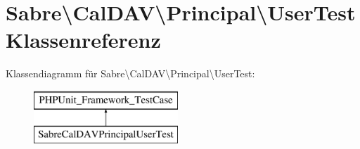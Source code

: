 \hypertarget{class_sabre_1_1_cal_d_a_v_1_1_principal_1_1_user_test}{}\section{Sabre\textbackslash{}Cal\+D\+AV\textbackslash{}Principal\textbackslash{}User\+Test Klassenreferenz}
\label{class_sabre_1_1_cal_d_a_v_1_1_principal_1_1_user_test}
Klassendiagramm für Sabre\textbackslash{}Cal\+D\+AV\textbackslash{}Principal\textbackslash{}User\+Test\+:\begin{figure}[H]
\begin{center}
\leavevmode
\includegraphics[height=2.000000cm]{class_sabre_1_1_cal_d_a_v_1_1_principal_1_1_user_test}
\end{center}
\end{figure}
